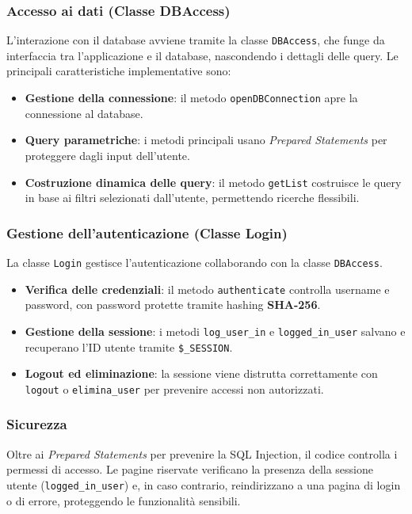 \documentclass[10pt, letterpaper]{article}
\begin{document}
\subsubsection{Accesso ai dati (Classe DBAccess)}
L'interazione con il database avviene tramite la classe \texttt{DBAccess}, che funge da interfaccia tra l'applicazione e il database, nascondendo i dettagli delle query.  
Le principali caratteristiche implementative sono:
\begin{itemize}
    \item \textbf{Gestione della connessione}: il metodo \texttt{openDBConnection} apre la connessione al database. 
    \item \textbf{Query parametriche}: i metodi principali usano \textit{Prepared Statements} per proteggere dagli input dell'utente.
    \item \textbf{Costruzione dinamica delle query}: il metodo \texttt{getList} costruisce le query in base ai filtri selezionati dall'utente, permettendo ricerche flessibili.
\end{itemize}

\subsubsection{Gestione dell'autenticazione (Classe Login)}
La classe \texttt{Login} gestisce l'autenticazione collaborando con la classe \texttt{DBAccess}.
\begin{itemize}
    \item \textbf{Verifica delle credenziali}: il metodo \texttt{authenticate} controlla username e password, con password protette tramite hashing \textbf{SHA-256}.
    \item \textbf{Gestione della sessione}: i metodi \texttt{log\_user\_in} e \texttt{logged\_in\_user} salvano e recuperano l'ID utente tramite \texttt{\$\_SESSION}. 
    \item \textbf{Logout ed eliminazione}: la sessione viene distrutta correttamente con \texttt{logout} o \texttt{elimina\_user} per prevenire accessi non autorizzati.
\end{itemize}

\subsubsection{Sicurezza}
Oltre ai \textit{Prepared Statements} per prevenire la SQL Injection, il codice controlla i permessi di accesso.  
Le pagine riservate verificano la presenza della sessione utente (\texttt{logged\_in\_user}) e, in caso contrario, reindirizzano a una pagina di login o di errore, proteggendo le funzionalità sensibili.
\end{document}
